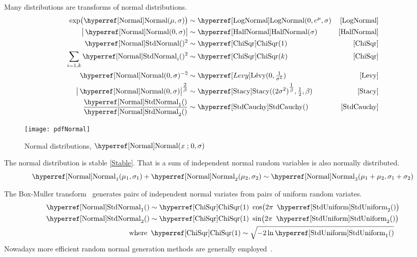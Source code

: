 Many distributions are transforms of normal distributions.
\begin{align*}
\exp\bigl(\opr{Normal}(\mu,\sigma) \bigr) &\sim \opr{LogNormal}(0, e^\mu, \sigma) & \eqref{LogNormal}  \checked
\\
\big| \opr{Normal}(0,\sigma) \big|  & \sim  \opr{HalfNormal}( \sigma) & \eqref{HalfNormal} \checked
\\
\oprr{StdNormal}{Normal}()^{2} & \sim \opr{ChiSqr}(1)  & \eqref{ChiSqr}  \checked
\\
\sum_{i=1,k}\oprr{StdNormal}{Normal}_i()^{2} & \sim \opr{ChiSqr}(k)  & \eqref{ChiSqr} \checked
\\
\opr{Normal}(0,\sigma)^{-2} & \sim \Levy( 0, \tfrac{1}{\sigma^2})   & \eqref{Levy}  \checked
\\
\big|\opr{Normal}(0,\sigma)\big|^{\tfrac{2}{\beta}} & \sim \opr{Stacy}( (2\sigma^2)^{\tfrac{1}{\beta}}, \tfrac{1}{2}, \beta )  & \eqref{Stacy}  
\\
\frac{\oprr{StdNormal}{Normal}_1()}{\oprr{StdNormal}{Normal}_2()}  & \sim  \opr{StdCauchy}() &\eqref{StdCauchy} \checked
\end{align*}



\begin{figure}[t]
\begin{center}
\texttt{[image: pdfNormal]}
\end{center}
\caption[Normal distributions]{Normal distributions, $\opr{Normal}(x\given 0,\sigma)$}
\end{figure}


The normal distribution is stable \eqref{Stable}. That is a sum of independent normal random variables is also normally distributed.
\[
 \opr{Normal}_1(\mu_1,\sigma_1) +  \opr{Normal}_2(\mu_2,\sigma_2) \sim  \opr{Normal}_3(\mu_1+\mu_2,\sigma_1+\sigma_2)
\checked
\]

The Box-Muller transform~\cite{Box1958} generates pairs of independent normal variates from pairs of uniform random variates.
\begin{align*}
\oprr{StdNormal}{Normal}_1() & \sim \opr{ChiSqr}(1)\ \cos\bigl( 2\pi\ \opr{StdUniform}_2() \bigr) \checked
\\
\oprr{StdNormal}{Normal}_2() & \sim \opr{ChiSqr}(1)\ \sin\bigl( 2\pi\ \opr{StdUniform}_2() \bigr) \checked
\\
\text{where }& \opr{ChiSqr}(1) \sim\sqrt{ - 2 \ln \opr{StdUniform}_1()}  \checked
\end{align*}
Nowadays more efficient random normal generation methods are generally employed~.






